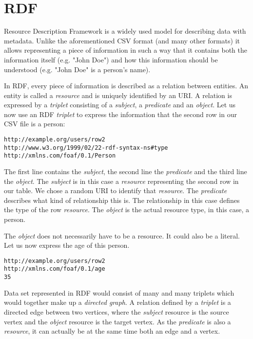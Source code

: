 \section{RDF}

Resource Description Framework \cite{rdf} is a widely used model for describing data with metadata. Unlike the aforementioned CSV format (and many other formats) it allows representing a piece of information in such a way that it contains both the information itself (e.g. "John Doe") and how this information should be understood (e.g. "John Doe" is a person's name). 

In RDF, every piece of information is described as a relation between entities. An entity is called a \emph{resource} and is uniquely identified by an URI. A relation is expressed by a \emph{triplet} consisting of a \emph{subject}, a \emph{predicate} and an \emph{object}. Let us now use an RDF \emph{triplet} to express the information that the second row in our CSV file is a person:

\begin{verbatim}
http://example.org/users/row2
http://www.w3.org/1999/02/22-rdf-syntax-ns#type 
http://xmlns.com/foaf/0.1/Person
\end{verbatim}

The first line contains the \emph{subject}, the second line the \emph{predicate} and the third line the \emph{object}. The \emph{subject} is in this case a \emph{resource} representing the second row in our table. We chose a random URI to identify that \emph{resource}. The \emph{predicate} describes what kind of relationship this is. The relationship in this case defines the type of the row \emph{resource}. The \emph{object} is the actual resource type, in this case, a person.

The \emph{object} does not necessarily have to be a resource. It could also be a literal. Let us now express the age of this person.

\begin{verbatim}
http://example.org/users/row2
http://xmlns.com/foaf/0.1/age
35
\end{verbatim}

Data set represented in RDF would consist of many and many triplets which would together make up a \emph{directed graph}. A relation defined by a \emph{triplet} is a directed edge between two vertices, where the \emph{subject} resource is the source vertex and the \emph{object} resource is the target vertex. As the \emph{predicate} is also a \emph{resource}, it can actually be at the same time both an edge and a vertex.

